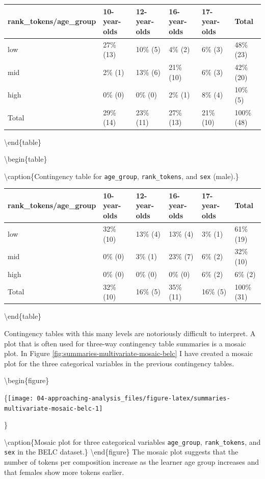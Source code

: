 \documentclass[
]{article}
\begin{document}
\begin{tabular}[t]{llllll}
\toprule
rank\_tokens/age\_group & 10-year-olds & 12-year-olds & 16-year-olds & 17-year-olds & Total\\
\midrule
low & 27\% (13) & 10\%  (5) & 4\%  (2) & 6\%  (3) & 48\% (23)\\
mid & 2\%  (1) & 13\%  (6) & 21\% (10) & 6\%  (3) & 42\% (20)\\
high & 0\%  (0) & 0\%  (0) & 2\%  (1) & 8\%  (4) & 10\%  (5)\\
Total & 29\% (14) & 23\% (11) & 27\% (13) & 21\% (10) & 100\% (48)\\
\bottomrule
\end{tabular}

\textbackslash end\{table\}

\textbackslash begin\{table\}

\textbackslash caption\{\label{tab:summaries-multivariate-categorical-table-belc-male}Contingency table for \texttt{age\_group}, \texttt{rank\_tokens}, and \texttt{sex} (male).\}
\centering

\begin{tabular}[t]{llllll}
\toprule
rank\_tokens/age\_group & 10-year-olds & 12-year-olds & 16-year-olds & 17-year-olds & Total\\
\midrule
low & 32\% (10) & 13\% (4) & 13\%  (4) & 3\% (1) & 61\% (19)\\
mid & 0\%  (0) & 3\% (1) & 23\%  (7) & 6\% (2) & 32\% (10)\\
high & 0\%  (0) & 0\% (0) & 0\%  (0) & 6\% (2) & 6\%  (2)\\
Total & 32\% (10) & 16\% (5) & 35\% (11) & 16\% (5) & 100\% (31)\\
\bottomrule
\end{tabular}

\textbackslash end\{table\}

Contingency tables with this many levels are notoriously difficult to interpret. A plot that is often used for three-way contingency table summaries is a mosaic plot. In Figure \ref{fig:summaries-multivariate-mosaic-belc} I have created a mosaic plot for the three categorical variables in the previous contingency tables.

\textbackslash begin\{figure\}

\{\centering \texttt{[image: 04-approaching-analysis\_files/figure-latex/summaries-multivariate-mosaic-belc-1]}

\}

\textbackslash caption\{Mosaic plot for three categorical variables \texttt{age\_group}, \texttt{rank\_tokens}, and \texttt{sex} in the BELC dataset.\}\label{fig:summaries-multivariate-mosaic-belc}
\textbackslash end\{figure\}
The mosaic plot suggests that the number of tokens per composition increase as the learner age group increases and that females show more tokens earlier.
\end{document}
